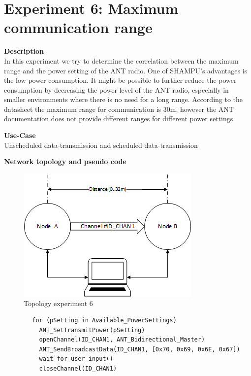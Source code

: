 \section{Experiment 6: Maximum communication range}
\begin{description} 
	\item{\textbf{Description}} \hfill \\  In this experiment we try to determine the correlation between the maximum range and the power setting of the ANT radio. One of SHAMPU's advantages is the low power consumption. It might be possible to further reduce the power consumption by decreasing the power level of the ANT radio, especially in smaller environments where there is no need for a long range. According to the datasheet the maximum range for communication is 30m, however the ANT documentation does not provide different ranges for different power settings. 
	
	\item{\textbf{Use-Case}} \hfill \\ Unscheduled data-transmission and scheduled data-transmission	
	\item{\textbf{Network topology and pseudo code}} \hfill \\ 
	\begin{figure}[H]
		\centering
		\includegraphics[scale=1]{content/images/exp6_topo.png}
		\caption{Topology experiment 6}
	\end{figure}
	
	\begin{code}[H]
		\begin{verbatim}
		for (pSetting in Available_PowerSettings)
		  ANT_SetTransmitPower(pSetting)
		  openChannel(ID_CHAN1, ANT_Bidirectional_Master)
		  ANT_SendBroadcastData(ID_CHAN1, [0x70, 0x69, 0x6E, 0x67])
		  wait_for_user_input()
		  closeChannel(ID_CHAN1)
		\end{verbatim}
		\caption{Maximum communication range (Master)}\label{lst:mExp6}
	\end{code}
	

\end{description}
